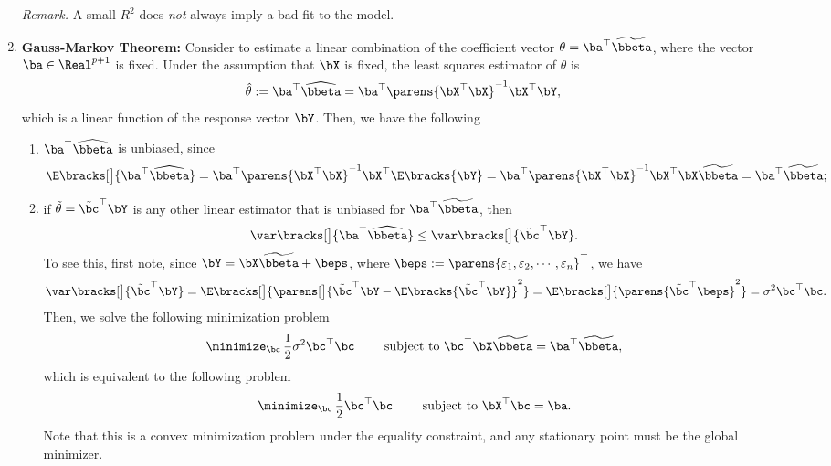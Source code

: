 \documentclass[12pt]{article}
\begin{document}
\begin{enumerate}[label=\textbf{\arabic*.}]
	\textit{Remark.} A small $R^2$ does \emph{not} always imply a bad fit to the model. 
	
	\item \textbf{Gauss-Markov Theorem:} Consider to estimate a linear combination of the coefficient vector $\theta = \ba^\top \widetilde{\bbeta}$, where the vector $\ba \in \Real^{p+1}$ is fixed. Under the assumption that $\bX$ is fixed, the least squares estimator of $\theta$ is 
	\begin{align*}
		\hat{\theta} := \ba^\top \widehat{\bbeta} = \ba^\top \parens{\bX^\top \bX}^{-1} \bX^\top \bY, 
	\end{align*}
	which is a linear function of the response vector $\bY$. Then, we have the following 
	\begin{enumerate}
		\item $\ba^\top \widehat{\bbeta}$ is unbiased, since 
		\begin{align*}
			\E \bracks[\big]{\ba^\top \widehat{\bbeta}} = \ba^\top \parens{\bX^\top \bX}^{-1} \bX^\top \E \bracks{\bY} = \ba^\top \parens{\bX^\top \bX}^{-1} \bX^\top \bX \widetilde{\bbeta} = \ba^\top \widetilde{\bbeta}; 
		\end{align*}
		\item if $\tilde{\theta} = \tilde{\bc}^\top \bY$ is any other linear estimator that is unbiased for $\ba^\top \widetilde{\bbeta}$, then 
		\begin{align*}
			\var \bracks[\big]{\ba^\top \widehat{\bbeta}} \le \var \bracks[\big]{\tilde{\bc}^\top \bY}. 
		\end{align*}
		To see this, first note, since $\bY = \bX \widetilde{\bbeta} + \beps$, where $\beps := \parens{\varepsilon_1, \varepsilon_2, \cdots, \varepsilon_n}^\top$, we have 
		\begin{align*}
			\var \bracks[\big]{\tilde{\bc}^\top \bY} = \E \bracks[\big]{\parens[\big]{\tilde{\bc}^\top \bY - \E \bracks{\tilde{\bc}^\top \bY}}^2} = \E \bracks[\big]{\parens{\tilde{\bc}^\top \beps}^2} = \sigma^2 \bc^\top \bc. 
		\end{align*}
		Then, we solve the following minimization problem 
		\begin{align*}
			\minimize_{\bc} \, \frac{1}{2} \sigma^2 \bc^\top \bc \qquad \text{ subject to } \bc^\top \bX \widetilde{\bbeta} = \ba^\top \widetilde{\bbeta}, 
		\end{align*}
		which is equivalent to the following problem 
		\begin{align*}
			\minimize_{\bc} \, \frac{1}{2} \bc^\top \bc \qquad \text{ subject to } \bX^\top \bc = \ba. 
		\end{align*}
		Note that this is a convex minimization problem under the equality constraint, and any stationary point must be the global minimizer. 
		

\end{enumerate}
\end{enumerate}
\end{document}

